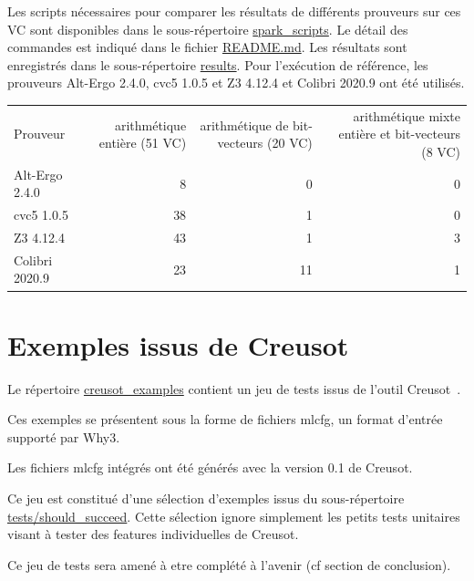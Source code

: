 \documentclass[a4paper,11pt]{article}
\begin{document}
Les scripts nécessaires pour comparer les résultats de différents prouveurs sur
ces VC sont disponibles dans le sous-répertoire \url{spark_scripts}. Le détail
des commandes est indiqué dans le fichier \url{README.md}. Les résultats sont
enregistrés dans le sous-répertoire \url{results}.  Pour l'exécution de
référence, les prouveurs Alt-Ergo 2.4.0, cvc5 1.0.5 et Z3 4.12.4 et Colibri
2020.9 ont été utilisés.

\begin{center}
  \begin{tabular}{|l|r|r|r|}
    \hline
  \rowcolor{gray!50} Prouveur
  & \multicolumn{1}{p{0.13\textwidth}|}{arithmétique entière (51 VC)}
  & \multicolumn{1}{p{0.13\textwidth}|}{arithmétique de bit-vecteurs (20 VC)}
  & \multicolumn{1}{p{0.13\textwidth}|}{arithmétique mixte entière et bit-vecteurs (8 VC)}
  \\
  Alt-Ergo 2.4.0                &  8 &  0 & 0  \\
  cvc5 1.0.5                    & 38 &  1 & 0 \\
  Z3 4.12.4                     & 43 &  1 & 3 \\
    Colibri 2020.9                & 23 & 11 & 1 \\
    \hline
\end{tabular}
\end{center}

\section{Exemples issus de Creusot}

Le répertoire \url{creusot_examples} contient un jeu de tests issus de
l'outil Creusot~\cite{denis22icfem}.

Ces exemples se présentent sous la forme de fichiers mlcfg, un format d'entrée supporté par Why3.

Les fichiers mlcfg intégrés ont été générés avec la version 0.1 de
Creusot.

Ce jeu est constitué d'une sélection d'exemples issus du
sous-répertoire \url{tests/should_succeed}. Cette sélection ignore
simplement les petits tests unitaires visant à tester des features
individuelles de Creusot.

Ce jeu de tests sera amené à etre complété à l'avenir (cf section de conclusion).
\end{document}
